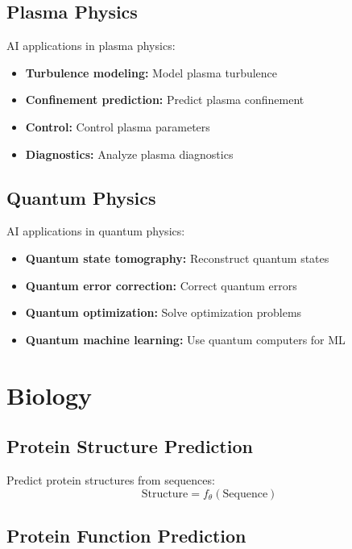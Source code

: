 \subsection{Plasma Physics}

AI applications in plasma physics:
\begin{itemize}
    \item \textbf{Turbulence modeling:} Model plasma turbulence
    \item \textbf{Confinement prediction:} Predict plasma confinement
    \item \textbf{Control:} Control plasma parameters
    \item \textbf{Diagnostics:} Analyze plasma diagnostics
\end{itemize}

\subsection{Quantum Physics}

AI applications in quantum physics:
\begin{itemize}
    \item \textbf{Quantum state tomography:} Reconstruct quantum states
    \item \textbf{Quantum error correction:} Correct quantum errors
    \item \textbf{Quantum optimization:} Solve optimization problems
    \item \textbf{Quantum machine learning:} Use quantum computers for ML
\end{itemize}

\section{Biology}

\subsection{Protein Structure Prediction}

Predict protein structures from sequences:
\begin{equation}
    \text{Structure} = f_\theta(\text{Sequence})
\end{equation}

\subsection{Protein Function Prediction}

